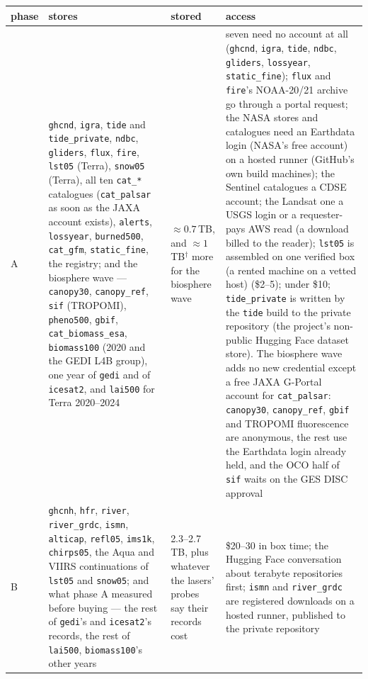 \documentclass[10pt]{article}
\newcommand{\code}[1]{\texttt{#1}}
\begin{document}
\begin{table}[H]
\centering\setlength{\tabcolsep}{3pt}\footnotesize
\begin{tabular}{@{}L{1.4cm}L{8.6cm}L{1.6cm}L{3.4cm}@{}}
\toprule
phase & stores & stored & access \\
\midrule
A & \code{ghcnd}, \code{igra}, \code{tide} and \code{tide\_private}, \code{ndbc}, \code{gliders}, \code{flux}, \code{fire}, \code{lst05} (Terra), \code{snow05} (Terra), all ten \code{cat\_*} catalogues (\code{cat\_palsar} as soon as the JAXA account exists), \code{alerts}, \code{lossyear}, \code{burned500}, \code{cat\_gfm}, \code{static\_fine}, the registry; and the biosphere wave --- \code{canopy30}, \code{canopy\_ref}, \code{sif} (TROPOMI), \code{pheno500}, \code{gbif}, \code{cat\_biomass\_esa}, \code{biomass100} (2020 and the GEDI L4B group), one year of \code{gedi} and of \code{icesat2}, and \code{lai500} for Terra 2020--2024 & $\approx 0.7$\,TB, and $\approx 1$\,TB$^\dagger$ more for the biosphere wave & seven need no account at all (\code{ghcnd}, \code{igra}, \code{tide}, \code{ndbc}, \code{gliders}, \code{lossyear}, \code{static\_fine}); \code{flux} and \code{fire}'s NOAA-20/21 archive go through a portal request; the NASA stores and catalogues need an Earthdata login (NASA's free account) on a hosted runner (GitHub's own build machines); the Sentinel catalogues a CDSE account; the Landsat one a USGS login or a requester-pays AWS read (a download billed to the reader); \code{lst05} is assembled on one verified box (a rented machine on a vetted host) (\$2--5); under \$10; \code{tide\_private} is written by the \code{tide} build to the private repository (the project's non-public Hugging Face dataset store). The biosphere wave adds no new credential except a free JAXA G-Portal account for \code{cat\_palsar}: \code{canopy30}, \code{canopy\_ref}, \code{gbif} and TROPOMI fluorescence are anonymous, the rest use the Earthdata login already held, and the OCO half of \code{sif} waits on the GES DISC approval \\
\addlinespace
B & \code{ghcnh}, \code{hfr}, \code{river}, \code{river\_grdc}, \code{ismn}, \code{alticap}, \code{refl05}, \code{ims1k}, \code{chirps05}, the Aqua and VIIRS continuations of \code{lst05} and \code{snow05}; and what phase A measured before buying --- the rest of \code{gedi}'s and \code{icesat2}'s records, the rest of \code{lai500}, \code{biomass100}'s other years & 2.3--2.7\,TB, plus whatever the lasers' probes say their records cost & \$20--30 in box time; the Hugging Face conversation about terabyte repositories first; \code{ismn} and \code{river\_grdc} are registered downloads on a hosted runner, published to the private repository \\

\end{tabular}
\end{table}
\end{document}

